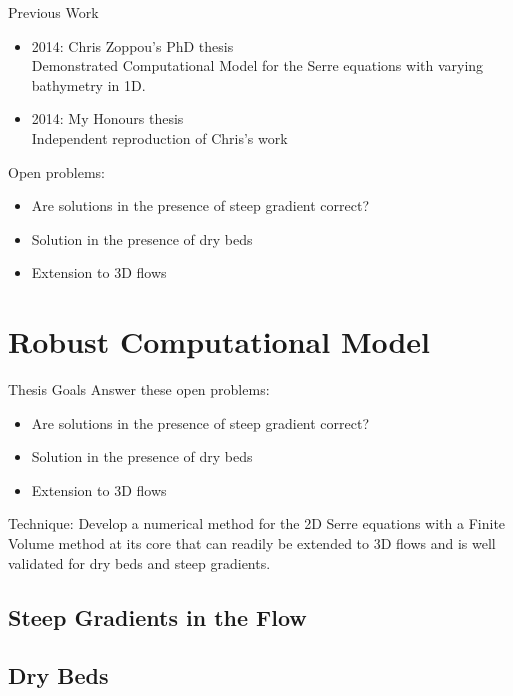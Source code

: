 \documentclass[pdf]{beamer}
\begin{document}
\begin{frame}{Previous Work}
	\begin{itemize}
		\item 2014: Chris Zoppou's PhD thesis \\
			Demonstrated Computational Model for the Serre equations with varying bathymetry in 1D.
		\item 2014: My Honours thesis \\
			Independent reproduction of Chris's work
	\end{itemize}
	Open problems:
	\begin{itemize}
		\item Are solutions in the presence of steep gradient correct?
		\item Solution in the presence of dry beds
		\item Extension to 3D flows
	\end{itemize}	
\end{frame}



\section{Robust Computational Model}

\begin{frame}{Thesis Goals}
	Answer these open problems:
	\begin{itemize}
		\item Are solutions in the presence of steep gradient correct?
		\item Solution in the presence of dry beds
		\item Extension to 3D flows
	\end{itemize}
	Technique: Develop a numerical method for the 2D Serre equations with a Finite Volume method at its core that can readily be extended to 3D flows and is well validated for dry beds and steep gradients. 
\end{frame}

\subsection{Steep Gradients in the Flow}
\begin{frame}
\end{frame}


\subsection{Dry Beds}
\begin{frame}
\end{frame}
\end{document}
